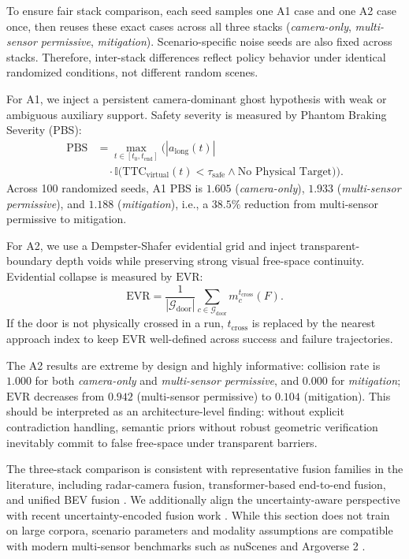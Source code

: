 \documentclass[sigconf,nonacm]{acmart}
\newcommand{\PBS}{\mathrm{PBS}}
\newcommand{\EVR}{\mathrm{EVR}}
\newcommand{\TTC}{\mathrm{TTC}}
\begin{document}
To ensure fair stack comparison, each seed samples one A1 case and one A2 case once, then reuses these exact cases across all three stacks (\textit{camera-only}, \textit{multi-sensor permissive}, \textit{mitigation}). Scenario-specific noise seeds are also fixed across stacks. Therefore, inter-stack differences reflect policy behavior under identical randomized conditions, not different random scenes.

For A1, we inject a persistent camera-dominant ghost hypothesis with weak or ambiguous auxiliary support. Safety severity is measured by Phantom Braking Severity (PBS):
\begin{equation}
\begin{aligned}
\PBS &= \max_{t \in [t_0, t_{\text{end}}]}
\Big(\left|a_{\text{long}}(t)\right| \\
&\quad\cdot\mathbb{I}\big(\TTC_{\text{virtual}}(t) < \tau_{\text{safe}} \land \text{No Physical Target}\big)\Big).
\end{aligned}
\label{eq:pbs}
\end{equation}
Across 100 randomized seeds, A1 $\PBS$ is $1.605$ (\textit{camera-only}), $1.933$ (\textit{multi-sensor permissive}), and $1.188$ (\textit{mitigation}), i.e., a $38.5\%$ reduction from multi-sensor permissive to mitigation.

For A2, we use a Dempster-Shafer evidential grid and inject transparent-boundary depth voids while preserving strong visual free-space continuity. Evidential collapse is measured by $\EVR$:
\begin{equation}
\EVR =
\frac{1}{\left|\mathcal{G}_{\text{door}}\right|}
\sum_{c \in \mathcal{G}_{\text{door}}}
m_c^{t_{\text{cross}}}(F).
\label{eq:evr}
\end{equation}
If the door is not physically crossed in a run, $t_{\text{cross}}$ is replaced by the nearest approach index to keep $\EVR$ well-defined across success and failure trajectories.

The A2 results are extreme by design and highly informative: collision rate is $1.000$ for both \textit{camera-only} and \textit{multi-sensor permissive}, and $0.000$ for \textit{mitigation}; $\EVR$ decreases from $0.942$ (multi-sensor permissive) to $0.104$ (mitigation). This should be interpreted as an architecture-level finding: without explicit contradiction handling, semantic priors without robust geometric verification inevitably commit to false free-space under transparent barriers.

The three-stack comparison is consistent with representative fusion families in the literature, including radar-camera fusion, transformer-based end-to-end fusion, and unified BEV fusion \cite{centerfusion2020,transfuser2021,bevfusion2022}. We additionally align the uncertainty-aware perspective with recent uncertainty-encoded fusion work \cite{umoe2023}. While this section does not train on large corpora, scenario parameters and modality assumptions are compatible with modern multi-sensor benchmarks such as nuScenes and Argoverse 2 \cite{caesar2020nuscenes,wilson2023argoverse2}.
\end{document}
